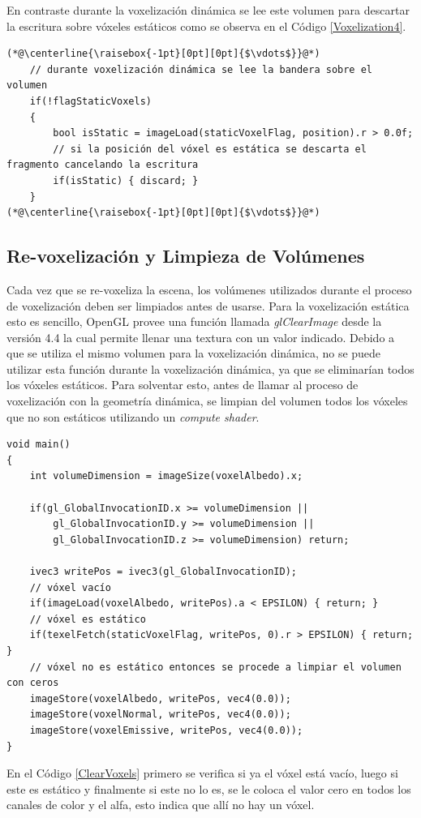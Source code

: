 En contraste durante la voxelización dinámica se lee este volumen para descartar la escritura sobre vóxeles estáticos como se observa en el Código \ref{Voxelization4}.
\\
\begin{lstlisting}[caption={Lectura de la bandera estática durante voxelización de geometría dinámica.}, label=Voxelization4]
(*@\centerline{\raisebox{-1pt}[0pt][0pt]{$\vdots$}}@*)
    // durante voxelización dinámica se lee la bandera sobre el volumen
    if(!flagStaticVoxels)
    {
        bool isStatic = imageLoad(staticVoxelFlag, position).r > 0.0f;
        // si la posición del vóxel es estática se descarta el fragmento cancelando la escritura
        if(isStatic) { discard; }
    }
(*@\centerline{\raisebox{-1pt}[0pt][0pt]{$\vdots$}}@*)
\end{lstlisting}

\subsection{Re-voxelización y Limpieza de Volúmenes}
Cada vez que se re-voxeliza la escena, los volúmenes utilizados durante el proceso de voxelización deben ser limpiados antes de usarse. Para la voxelización estática esto es sencillo, OpenGL provee una función llamada \emph{glClearImage} desde la versión 4.4 la cual permite llenar una textura con un valor indicado. Debido a que se utiliza el mismo volumen para la voxelización dinámica, no se puede utilizar esta función durante la voxelización dinámica, ya que se eliminarían todos los vóxeles estáticos. Para solventar esto, antes de llamar al proceso de voxelización con la geometría dinámica, se limpian del volumen todos los vóxeles que no son estáticos utilizando un \emph{compute shader}.
\\
\begin{lstlisting}[caption={Limpieza de vóxeles no estáticos.}, label=ClearVoxels]
void main()
{
    int volumeDimension = imageSize(voxelAlbedo).x;

    if(gl_GlobalInvocationID.x >= volumeDimension ||
        gl_GlobalInvocationID.y >= volumeDimension ||
        gl_GlobalInvocationID.z >= volumeDimension) return;

    ivec3 writePos = ivec3(gl_GlobalInvocationID);
    // vóxel vacío
    if(imageLoad(voxelAlbedo, writePos).a < EPSILON) { return; }
    // vóxel es estático
    if(texelFetch(staticVoxelFlag, writePos, 0).r > EPSILON) { return; }
    // vóxel no es estático entonces se procede a limpiar el volumen con ceros
    imageStore(voxelAlbedo, writePos, vec4(0.0));
    imageStore(voxelNormal, writePos, vec4(0.0));
    imageStore(voxelEmissive, writePos, vec4(0.0));
}
\end{lstlisting}

En el Código \ref{ClearVoxels} primero se verifica si ya el vóxel está vacío, luego si este es estático y finalmente si este no lo es, se le coloca el valor cero en todos los canales de color y el alfa, esto indica que allí no hay un vóxel.
